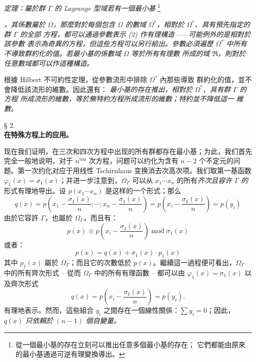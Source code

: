 \documentclass[11pt]{article}
\providecommand{\srcfn}[2]{%
  \begingroup
  \renewcommand{\thefootnote}{#1}%
  \footnote{#2}%
  \addtocounter{footnote}{-1}%
  \endgroup}
\begin{document}
\emph{定理：屬於群 $\Gamma$ 的 Lagrange 型域若有一個最小基}
\srcfn{***)}{從一個最小基的存在立刻可以推出任意多個最小基的存在；
它們都能由原來的最小基通過可逆有理變換導出。}
\emph{，其係數屬於 $\Omega$，那麼對於每個包含 $\Omega$ 的數域
$\Omega^*$，相對於 $\Omega^*$、具有預先指定的群 $\Gamma$ 的全部
方程，都可以通過參數表示 (2) 作有理構造——可能例外的是相對於該參數
表示為奇異的方程，但這些方程可以另行給出。參數必須遍歷 $\Omega^*$
中所有不導致群約化的值。若最小基的係數域 $\Omega$ 等於所有有理數
所成的域 $\mathfrak R$，則對於任意數域都可以作這種構造。}

根據 Hilbert 不可約性定理，從參數流形中排除 $\Omega^*$ 內那些導致
群約化的值，並不會降低該流形的維數。因此還有：
\emph{最小基的存在推出，相對於 $\Omega^*$、具有群 $\Gamma$ 的方程
所成流形的維數，等於無特約方程所成流形的維數；特約並不降低這一
維數。}

\begin{center}
§ 2.\\[0.75em]
\textbf{在特殊方程上的应用。}
\end{center}

现在我们证明，在三次和四次方程中出现的所有群都存在最小基；为此，我们首先完全一般地说明，对于 $n^{\text{ten}}$ 次方程，问题可以约化为含有 $n-2$ 个不定元的问题。第一次约化对应于用线性 Tschirnhaus 变换消去次高次项。我们取第一基函数 $\varphi_1(x)=\sigma_1(x)$；并进一步注意到，$\Omega_\Gamma$ 可以从 $x_1\cdots x_n$ 的所有\emph{齐次且容许 $\Gamma$ 的}形式有理地导出。设 $p(x_1\cdots x_n)$ 是这样的一个形式；那么
\[
q(x)=p\left(x_1-\frac{\sigma_1(x)}{n};\cdots;x_n-\frac{\sigma_1(x)}{n}\right)=p\left(x_i-\frac{\sigma_1(x)}{n}\right)=p(y_i)
\]
由於它容許 $\Gamma$，也屬於 $\Omega_\Gamma$，而且有：
\[
p(x)\equiv p\left(x_i-\frac{\sigma_1(x)}{n}\right)\operatorname{mod}\sigma_1(x)
\]
或者：
\[
p(x)=q(x)+\sigma_1(x)\cdot p_1(x)
\]
其中 $p_1(x)$ 屬於 $\Omega_\Gamma$；而且它的次數低於 $p(x)$。繼續這一過程便可看出，$\Omega_\Gamma$ 中的所有齊次形式 -- 從而 $\Omega_\Gamma$ 中的所有有理函數 -- 都可以由 $\varphi_1(x)=\sigma_1(x)$ 以及齊次形式
\[
q(x)=p\left(x_i-\frac{\sigma_1(x)}{n}\right)=p(y_i).
\]
有理地表示。然而，這些組合 $y_i$ 之間存在一個線性關係：$\sum y_i=0$；因此，$q(x)$ \emph{只依賴於 $(n-1)$ 個自變量。}
\end{document}
